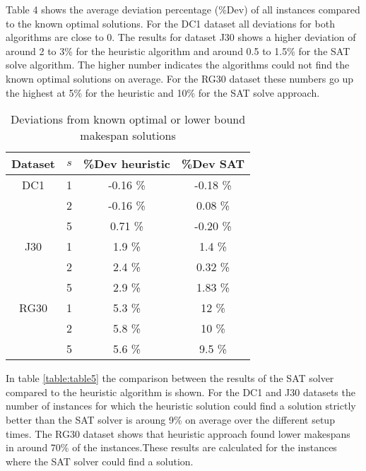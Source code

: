 Table 4 shows the average deviation percentage (\%Dev) of all instances compared to the known optimal solutions. For the DC1 dataset all deviations for both algorithms are close to 0. The results for dataset J30 shows a higher deviation of around 2 to 3\% for the heuristic algorithm and around 0.5 to 1.5\% for the SAT solve algorithm. The higher number indicates the algorithms could not find the known optimal solutions on average. For the RG30 dataset these numbers go up the highest at 5\% for the heuristic and 10\% for the SAT solve approach.

\begin{table}
	\begin{center}
		\caption{Deviations from known optimal or lower bound makespan solutions}
		\label{table:table4}
		\begin{tabular}{ c | c c c }
			Dataset & \(s\) & \%Dev heuristic & \%Dev SAT \\
			\hline
			DC1  & 1 & -0.16 \% & -0.18 \% \\ 
			  & 2 & -0.16 \% & 0.08 \% \\  
			  & 5 & 0.71 \% & -0.20 \% \\ 
			J30  & 1 & 1.9 \% & 1.4 \% \\ 
			  & 2 & 2.4 \% & 0.32 \% \\  
			  & 5 & 2.9 \% & 1.83 \% \\ 
			RG30 & 1 & 5.3 \% & 12 \% \\ 
			 & 2 & 5.8 \% & 10 \% \\  
			 & 5 & 5.6 \% & 9.5 \%
		\end{tabular}
	\end{center}
\end{table}

In table \ref{table:table5} the comparison between the results of the SAT solver compared to the heuristic algorithm is shown. For the DC1 and J30 datasets the number of instances for which the heuristic solution could find a solution strictly better than the SAT solver is aroung 9\% on average over the different setup times. The RG30 dataset shows that heuristic approach found lower makespans in around 70\% of the instances.These results are calculated for the instances where the SAT solver could find a solution.

